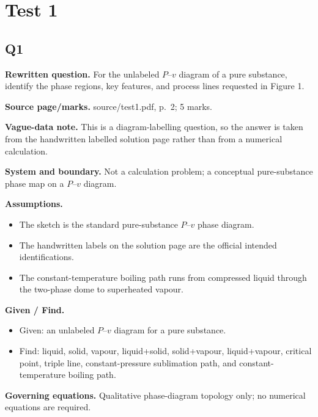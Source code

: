 \section*{Test 1}

\subsection*{Q1}
\textbf{Rewritten question.} For the unlabeled $P$--$v$ diagram of a pure substance, identify the phase regions, key features, and process lines requested in Figure 1.

\textbf{Source page/marks.} source/test1.pdf, p.~2; 5 marks.

\textbf{Vague-data note.} This is a diagram-labelling question, so the answer is taken from the handwritten labelled solution page rather than from a numerical calculation.

\textbf{System and boundary.} Not a calculation problem; a conceptual pure-substance phase map on a $P$--$v$ diagram.

\textbf{Assumptions.}
\begin{itemize}
  \item The sketch is the standard pure-substance $P$--$v$ phase diagram.
  \item The handwritten labels on the solution page are the official intended identifications.
  \item The constant-temperature boiling path runs from compressed liquid through the two-phase dome to superheated vapour.
\end{itemize}

\textbf{Given / Find.}
\begin{itemize}
  \item Given: an unlabeled $P$--$v$ diagram for a pure substance.
  \item Find: liquid, solid, vapour, liquid+solid, solid+vapour, liquid+vapour, critical point, triple line, constant-pressure sublimation path, and constant-temperature boiling path.
\end{itemize}

\textbf{Governing equations.} Qualitative phase-diagram topology only; no numerical equations are required.

